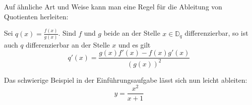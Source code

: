 Auf ähnliche Art und Weise kann man eine Regel für die Ableitung von Quotienten herleiten:

\begin{theo}{}
    Sei $q(x)=\frac{f(x)}{g(x)}$. Sind $f$ und $g$ beide an der Stelle $x \in \mathbb{D}_q$ differenzierbar, so ist auch $q$ differenzierbar an der Stelle $x$ und es gilt
    $$q'(x)=\frac{g(x)f'(x)-f(x)g'(x)}{(g(x))^2}$$
\end{theo}

\begin{example}
    {}{}
    Das schwierige Beispiel in der Einführungsaufgabe lässt sich nun leicht ableiten:
    $$y=\frac{x^2}{x+1} $$ %

\end{example}

